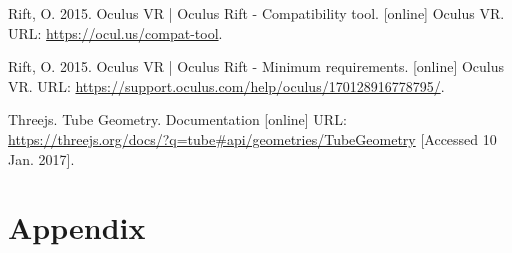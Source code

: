 \documentclass[12pt]{article} %
\begin{document}
\begin{flushleft}
\begin{thebibliography}{99}
 Rift, O. 2015. Oculus VR | Oculus Rift - Compatibility tool. [online] Oculus VR. URL: \url{https://ocul.us/compat-tool}.

 Rift, O. 2015. Oculus VR | Oculus Rift - Minimum requirements. [online] Oculus VR. URL: \url{https://support.oculus.com/help/oculus/170128916778795/}.

Threejs. Tube Geometry. Documentation [online] URL: \url{https://threejs.org/docs/?q=tube#api/geometries/TubeGeometry} [Accessed 10 Jan. 2017].

\end{thebibliography}

\newpage
\section{Appendix}

\end{flushleft}
\end{document}
